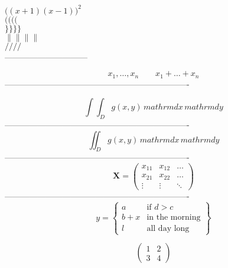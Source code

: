 \documentclass{article}
\begin{document}
  \begin{center}
    $\Big( (x+1) (x-1) \Big)^2$\\
    $\big(\Big(\bigg(\Bigg($\\
    $\big\}\Big\}\bigg\}\Bigg\}$\\
    $\big\|\Big\|\bigg\|\Bigg\|$\\
    $\big/\Big/\bigg/\Bigg/$\\
    ------------------------------
  \end{center}
  \begin{center}
    \begin{displaymath}
      x_{1},\ldots,x_{n}\qquad
      x_{1}+\ldots+x_{n}
    \end{displaymath}
    -------------------------------------------------------------------
  \end{center}
  \begin{center}
    \newcommand{\ud}{mathrm{d}}
    \begin{displaymath}
      \int\!\!\!\int_{D} g(x,y) \,\ud x\,\ud y
    \end{displaymath}
    -------------------------------------------------------------------
    \begin{displaymath}
      \iint_{D} g(x,y) \,\ud x \,\ud y
    \end{displaymath}
    -------------------------------------------------------------------
    \begin{displaymath}
      \mathbf{X} =
      \left( \begin{array}{ccc}
        x_{11} & x_{12} & \ldots \\
        x_{21} & x_{22} & \ldots \\
        \vdots & \vdots & \ddots
      \end{array} \right)
    \end{displaymath}
    -------------------------------------------------------------------
    \begin{displaymath}
      y = \left\{ \begin{array}{ll}
        a & \textrm{if $d>c$}\\
        b+x & \textrm{in the morning}\\
        l & \textrm{all day long}
      \end{array} \right\}
      \end{displaymath}

    \begin{displaymath}
      \left(\begin{array}{c|c}
        1 & 2 \\
        \hline
	    3 & 4
      \end{array}\right)
    \end{displaymath}
  \end{center}
\end{document}
